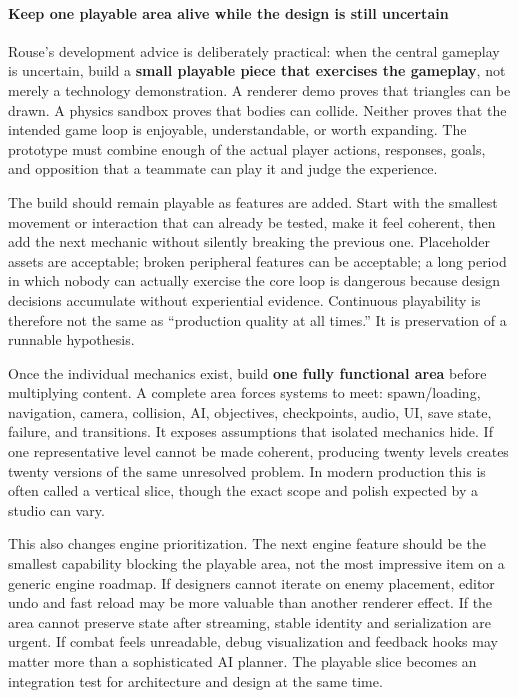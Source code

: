 \paragraph{Keep one playable area alive while the design is still uncertain}\label{keep-one-playable-area-alive-while-the-design-is-still-uncertain}

Rouse's development advice is deliberately practical: when the central gameplay is uncertain, build a \textbf{small playable piece that exercises the gameplay}, not merely a technology demonstration. A renderer demo proves that triangles can be drawn. A physics sandbox proves that bodies can collide. Neither proves that the intended game loop is enjoyable, understandable, or worth expanding. The prototype must combine enough of the actual player actions, responses, goals, and opposition that a teammate can play it and judge the experience.

The build should remain playable as features are added. Start with the smallest movement or interaction that can already be tested, make it feel coherent, then add the next mechanic without silently breaking the previous one. Placeholder assets are acceptable; broken peripheral features can be acceptable; a long period in which nobody can actually exercise the core loop is dangerous because design decisions accumulate without experiential evidence. Continuous playability is therefore not the same as ``production quality at all times.'' It is preservation of a runnable hypothesis.

Once the individual mechanics exist, build \textbf{one fully functional area} before multiplying content. A complete area forces systems to meet: spawn/loading, navigation, camera, collision, AI, objectives, checkpoints, audio, UI, save state, failure, and transitions. It exposes assumptions that isolated mechanics hide. If one representative level cannot be made coherent, producing twenty levels creates twenty versions of the same unresolved problem. In modern production this is often called a vertical slice, though the exact scope and polish expected by a studio can vary.

This also changes engine prioritization. The next engine feature should be the smallest capability blocking the playable area, not the most impressive item on a generic engine roadmap. If designers cannot iterate on enemy placement, editor undo and fast reload may be more valuable than another renderer effect. If the area cannot preserve state after streaming, stable identity and serialization are urgent. If combat feels unreadable, debug visualization and feedback hooks may matter more than a sophisticated AI planner. The playable slice becomes an integration test for architecture and design at the same time.


